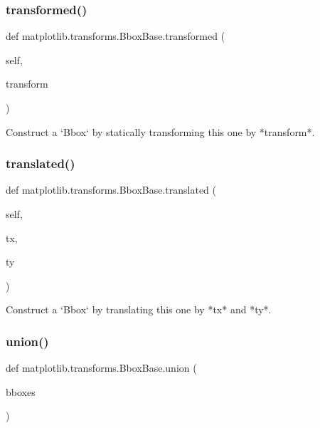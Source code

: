 \subsubsection{\texorpdfstring{transformed()}{transformed()}}
{\footnotesize\ttfamily def matplotlib.\+transforms.\+Bbox\+Base.\+transformed (\begin{DoxyParamCaption}\item[{}]{self,  }\item[{}]{transform }\end{DoxyParamCaption})}

\begin{DoxyVerb}Construct a `Bbox` by statically transforming this one by *transform*.
\end{DoxyVerb}
 \mbox{\label{classmatplotlib_1_1transforms_1_1BboxBase_a23a3abbc8ef8e2d4c5a642a14631bbe1}} 
\subsubsection{\texorpdfstring{translated()}{translated()}}
{\footnotesize\ttfamily def matplotlib.\+transforms.\+Bbox\+Base.\+translated (\begin{DoxyParamCaption}\item[{}]{self,  }\item[{}]{tx,  }\item[{}]{ty }\end{DoxyParamCaption})}

\begin{DoxyVerb}Construct a `Bbox` by translating this one by *tx* and *ty*.\end{DoxyVerb}
 \mbox{\label{classmatplotlib_1_1transforms_1_1BboxBase_a73e26e07f58806d5270a2b06c6a2bb9f}} 
\subsubsection{\texorpdfstring{union()}{union()}}
{\footnotesize\ttfamily def matplotlib.\+transforms.\+Bbox\+Base.\+union (\begin{DoxyParamCaption}\item[{}]{bboxes }\end{DoxyParamCaption})\hspace{0.3cm}{\ttfamily [static]}}

